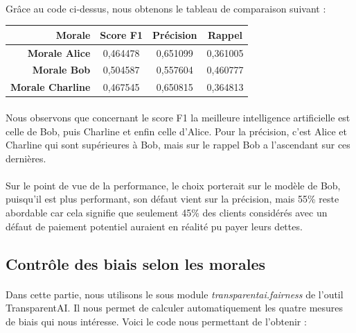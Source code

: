 \documentclass[10pt, french, a4paper]{report}
\begin{document}
\paragraph{}
Grâce au code ci-dessus, nous obtenons le tableau de comparaison suivant : 

\begin{center}
  \begin{tabular}{ |r|c|c|c| } 
    \hline
     Morale & Score F1 & Précision & Rappel  \\
    \hline
    \hline
    \textbf{Morale Alice} & 0,464478 & 0,651099 & 0,361005 \\
    \textbf{Morale Bob} & 0,504587 & 0,557604 & 0,460777 \\
    \textbf{Morale Charline} & 0,467545 & 0,650815 & 0,364813 \\
    \hline
  \end{tabular}
\end{center}

\paragraph{}
Nous observons que concernant le score F1 la meilleure intelligence artificielle est celle de Bob, puis Charline et enfin celle d'Alice. Pour la précision, c'est Alice et Charline qui sont supérieures à Bob, mais sur le rappel Bob a l'ascendant sur ces dernières.

\paragraph{}
Sur le point de vue de la performance, le choix porterait sur le modèle de Bob, puisqu'il est plus performant, son défaut vient sur la précision, mais 55\% reste abordable car cela signifie que seulement 45\% des clients considérés avec un défaut de paiement potentiel auraient en réalité pu payer leurs dettes. 

\subsection{Contrôle des biais selon les morales}

\paragraph{}
Dans cette partie, nous utilisons le sous module \textit{transparentai.fairness} de l'outil TransparentAI. Il nous permet de calculer automatiquement les quatre mesures de biais qui nous intéresse. Voici le code nous permettant de l'obtenir :
\end{document}
